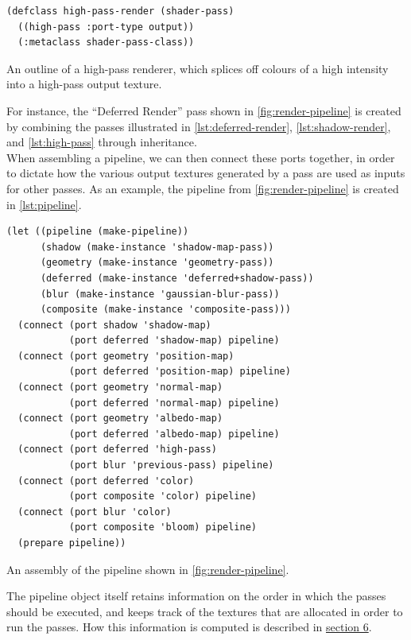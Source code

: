 \documentclass[format=sigconf]{acmart}
\begin{document}
\begin{listing}[h]
\begin{verbatim}
(defclass high-pass-render (shader-pass)
  ((high-pass :port-type output))
  (:metaclass shader-pass-class))
\end{verbatim}
\caption{An outline of a high-pass renderer, which splices off colours of a high intensity into a high-pass output texture.}
\label{lst:high-pass}
\end{listing}

For instance, the ``Deferred Render'' pass shown in \autoref{fig:render-pipeline} is created by combining the passes illustrated in \autoref{lst:deferred-render}, \autoref{lst:shadow-render}, and \autoref{lst:high-pass} through inheritance. \\

When assembling a pipeline, we can then connect these ports together, in order to dictate how the various output textures generated by a pass are used as inputs for other passes. As an example, the pipeline from \autoref{fig:render-pipeline} is created in \autoref{lst:pipeline}. \\

\begin{listing}[h]
\begin{verbatim}
(let ((pipeline (make-pipeline))
      (shadow (make-instance 'shadow-map-pass))
      (geometry (make-instance 'geometry-pass))
      (deferred (make-instance 'deferred+shadow-pass))
      (blur (make-instance 'gaussian-blur-pass))
      (composite (make-instance 'composite-pass)))
  (connect (port shadow 'shadow-map) 
           (port deferred 'shadow-map) pipeline)
  (connect (port geometry 'position-map)
           (port deferred 'position-map) pipeline)
  (connect (port geometry 'normal-map)
           (port deferred 'normal-map) pipeline)
  (connect (port geometry 'albedo-map)
           (port deferred 'albedo-map) pipeline)
  (connect (port deferred 'high-pass)
           (port blur 'previous-pass) pipeline)
  (connect (port deferred 'color)
           (port composite 'color) pipeline)
  (connect (port blur 'color)
           (port composite 'bloom) pipeline)
  (prepare pipeline))
\end{verbatim}
\caption{An assembly of the pipeline shown in \autoref{fig:render-pipeline}.}
\label{lst:pipeline}
\end{listing}

The pipeline object itself retains information on the order in which the passes should be executed, and keeps track of the textures that are allocated in order to run the passes. How this information is computed is described in \hyperref[allocation]{section 6}. \\
\end{document}
